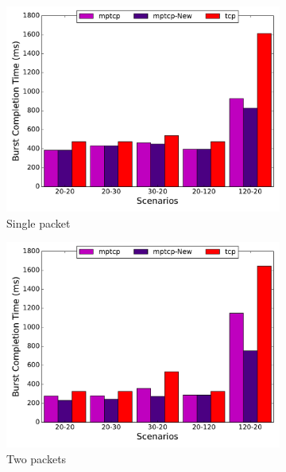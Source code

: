 \documentclass[10pt,conference,compsoc]{IEEEtran}
\begin{document}
\begin{figure}[!tbp]
\begin{subfigure}[b]{0.32\textwidth}
\includegraphics[angle=0, width=\textwidth, natwidth=578.16,natheight=433.62]{plots/1PNew.pdf}
\caption{Single packet}\label{1pn}
\end{subfigure}
\hfill
\begin{subfigure}[b]{0.32\textwidth}
\includegraphics[angle=0, width=\textwidth, natwidth=578.16,natheight=433.62]{plots/2PNew.pdf}
\caption{Two packets}\label{2pn}
\end{subfigure}
\hfill
\begin{subfigure}[b]{0.32\textwidth}

\end{subfigure}
\end{figure}
\end{document}
